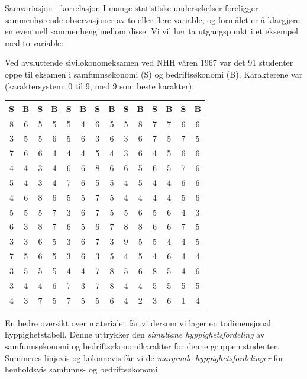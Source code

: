 \begin{eksempel} {Samvariasjon - korrelasjon}
I mange statistiske undersøkelser foreligger sammenhørende
observasjoner av to eller flere variable, og formålet er å
klargjøre en eventuell sammenheng mellom disse.  Vi vil her ta
utgangspunkt i et eksempel med to variable:
             
Ved avsluttende siviløkonomeksamen ved NHH våren 1967 var det 91
studenter oppe til eksamen i samfunnsøkonomi (S) og
bedriftsøkonomi (B).  Karakterene var (karaktersystem: 0 til 9,
med 9 som beste karakter):
\begin{center}   
 \begin{tabular}{|cc|cc|cc|cc|cc|cc|cc|} \hline
S & B & S & B & S & B & S & B & S & B & S & B & S & B \\ \hline
8 & 6 & 5 & 5 & 5 & 4 & 6 & 5 & 5 & 8 & 7 & 7 & 6 & 6 \\
3 & 5 & 5 & 6 & 5 & 6 & 3 & 6 & 3 & 6 & 7 & 5 & 7 & 5 \\
7 & 6 & 6 & 4 & 4 & 4 & 5 & 4 & 3 & 6 & 4 & 5 & 6 & 6 \\
4 & 4 & 3 & 4 & 6 & 6 & 8 & 6 & 6 & 5 & 6 & 5 & 7 & 6 \\      
5 & 4 & 3 & 4 & 7 & 6 & 5 & 5 & 4 & 5 & 4 & 4 & 6 & 6 \\
4 & 6 & 8 & 6 & 5 & 5 & 7 & 5 & 4 & 4 & 4 & 4 & 5 & 6 \\
5 & 5 & 5 & 7 & 3 & 6 & 7 & 5 & 5 & 6 & 5 & 6 & 4 & 3 \\
6 & 3 & 8 & 7 & 6 & 5 & 6 & 7 & 8 & 8 & 6 & 6 & 7 & 5 \\
3 & 3 & 6 & 5 & 3 & 6 & 7 & 3 & 9 & 5 & 5 & 4 & 4 & 5 \\
7 & 5 & 6 & 5 & 3 & 6 & 3 & 5 & 4 & 5 & 4 & 6 & 4 & 4 \\
3 & 5 & 5 & 5 & 4 & 4 & 7 & 8 & 5 & 6 & 8 & 5 & 4 & 6 \\
3 & 4 & 4 & 6 & 7 & 3 & 7 & 8 & 4 & 4 & 5 & 5 & 5 & 5 \\
4 & 3 & 7 & 5 & 7 & 5 & 5 & 6 & 4 & 2 & 3 & 6 & 1 & 4 \\ \hline
 \end{tabular}
\end{center}
                            
\noindent
En bedre oversikt over materialet får vi dersom vi lager en
todimensjonal hyppighetstabell. Denne uttrykker den 
{\em simultane hyppighetsfordeling} av
samfunns\-øko\-nomi og bedriftsøkonomikarakter for denne gruppen studenter. 
Summeres linjevis og kolonnevis får vi de {\em marginale hyppighetsfordelinger}
for henholdsvis samfunns- og bedriftsøkonomi.


\end{eksempel}
